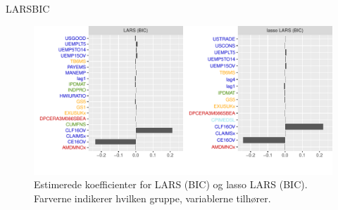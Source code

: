 \begin{frame}{LARS}{BIC}
\begin{figure}
 \includegraphics[width=1\linewidth, height=0.7\textheight]{slides/coef_plot_lars_bic.pdf}
 \caption{Estimerede koefficienter for LARS (BIC) og lasso LARS (BIC). Farverne indikerer hvilken gruppe, variablerne tilhører.}
 \end{figure}
\end{frame}

